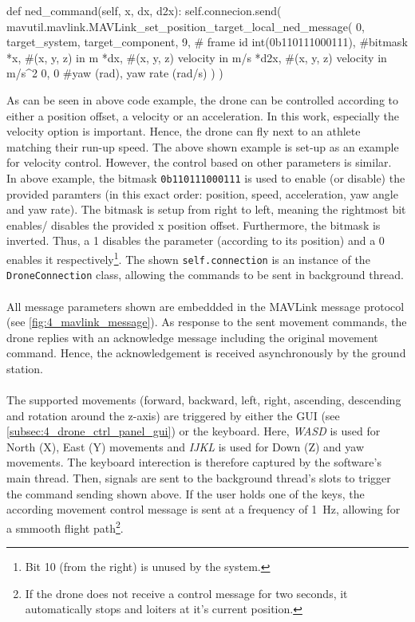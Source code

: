 \begin{pythoncode}[caption=Movement commands using local\_ned,label=alg:send_ned_command]
    def ned_command(self, x, dx, d2x):
        self.connecion.send(
            mavutil.mavlink.MAVLink_set_position_target_local_ned_message(
                0, target_system, target_component,
                9, # frame id
                int(0b110111000111), #bitmask
                *x, #(x, y, z) in m
                *dx, #(x, y, z) velocity in m/s
                *d2x, #(x, y, z) velocity in m/s^2
                0, 0 #yaw (rad), yaw rate (rad/s)
            )
        )
\end{pythoncode}
As can be seen in above code example, the drone can be controlled according to
either a position offset, a velocity or an acceleration.
In this work, especially the velocity option is important.
Hence, the drone can fly next to an athlete matching their run-up speed.
The above shown example is set-up as an example for velocity control.
However, the control based on other parameters is similar.\\
In above example, the bitmask \texttt{0b110111000111} is used to enable (or
disable) the provided paramters (in this exact order: position, speed,
acceleration, yaw angle and yaw rate).
The bitmask is setup from right to left, meaning the rightmost bit enables/
disables the provided x position offset.
Furthermore, the bitmask is inverted.
Thus, a 1 disables the parameter (according to its position) and a 0 enables
it respectively\footnote{Bit 10 (from the right) is unused by the system.}.
The shown \texttt{self.connection} is an instance of the
\texttt{DroneConnection} class, allowing the commands to be sent in background
thread.\\\\
\noindent All message parameters shown are embeddded in the MAVLink message
protocol (see \autoref{fig:4_mavlink_message}).
As response to the sent movement commands, the drone replies with an
acknowledge message including the original movement command.
Hence, the acknowledgement is received asynchronously by the ground station.\\\\
\noindent The supported movements (forward, backward, left, right, ascending,
descending and rotation around the z-axis) are triggered by either the
\ac{GUI} (see \autoref{subsec:4_drone_ctrl_panel_gui}) or the keyboard.
Here, \textit{WASD} is used for North (X), East (Y) movements and
\textit{IJKL} is used for Down (Z) and yaw movements.
The keyboard interection is therefore captured by the software's main thread.
Then, signals are sent to the background thread's slots to trigger the command
sending shown above.
If the user holds one of the keys, the according movement control message is
sent at a frequency of 1~Hz, allowing for a smmooth flight path\footnote{If
the drone does not receive a control message for two seconds, it automatically
stops and loiters at it's current position.}. 

